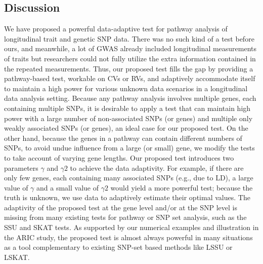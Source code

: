 \documentclass[12pt]{article}
\begin{document}
\subsection{Discussion}
We have proposed a powerful data-adaptive test for pathway analysis of longitudinal trait and genetic SNP data. There was no such kind of a test before ours, and meanwhile, a lot of GWAS  \cite{Aulchenko2009,Ionita-Laza2007,Kamatani2010,Kathiresan2007,Sabatti2008} already included longitudinal measurements of traits but researchers could not fully utilize the extra information contained in the repeated measurements. Thus, our proposed test fills the gap by providing a pathway-based test, workable on CVs or RVs, and adaptively accommodate itself to maintain a high power for various unknown data scenarios in a longitudinal data analysis setting. Because any pathway analysis involves multiple genes, each containing multiple SNPs, it is desirable to apply a test that can maintain high power with a large number of non-associated SNPs (or genes) and multiple only weakly associated SNPs (or genes), an ideal case for our proposed test. On the other hand, because the genes in a pathway can contain different numbers of SNPs, to avoid undue influence from a large (or small) gene, we modify the tests to take account of varying gene lengths. Our proposed test introduces two parameters $\gamma$ and $\gamma2$ to achieve the data adaptivity. For example, if there are only few genes, each containing many associated SNPs (e.g., due to LD), a large value of $\gamma$ and a small value of $\gamma2$ would yield a more powerful test; because the truth is unknown, we use data to adaptively estimate their optimal values. The adaptivity of the proposed test at the gene level and/or at the SNP level is missing from many existing tests for pathway or SNP set analysis, such as the SSU and SKAT tests. As supported by our numerical examples and illustration in the ARIC study, the proposed test is almost always powerful in many situations as a tool complementary to existing SNP-set based methods like LSSU or LSKAT. 
\end{document}
